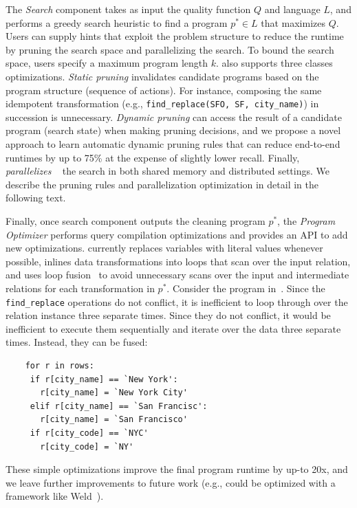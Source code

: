 The {\it Search} component takes as input the quality function $Q$ and language $L$, and performs a greedy search heuristic to find a program $p^* \in L$ that maximizes $Q$.  Users can supply hints that exploit the problem structure to reduce the runtime by pruning the search space and parallelizing the search.  To bound the search space, users specify a maximum program length $k$.    \sys also supports three classes optimizations. {\it Static pruning} invalidates candidate programs based on the program structure (sequence of actions).  For instance, composing the same idempotent transformation (e.g., \texttt{find\_replace(SFO, SF, city\_name)}) in succession is unnecessary.  {\it Dynamic pruning} can access the result of a candidate program (search state) when making pruning decisions, and we propose a novel approach to learn automatic dynamic pruning rules that can reduce end-to-end runtimes by up to 75\% at the expense of slightly lower recall. Finally, \sys ~ {\it parallelizes} ~ the search in both shared memory and distributed settings. We describe the pruning rules and parallelization optimization in detail in the following text.


Finally, once search component outputs the cleaning program $p^*$, the {\it Program Optimizer} performs query compilation optimizations and provides an API to add new optimizations.  \sys currently replaces variables with literal values whenever possible, inlines data transformations into loops that scan over the input relation, and uses loop fusion~\cite{palkar2017weld, crotty2014tupleware} to avoid unnecessary scans over the input and intermediate relations for each transformation in $p^*$.  Consider the program in~.  Since the \texttt{find\_replace} operations do not conflict, it is inefficient to loop through over the relation instance three separate times.  Since they do not conflict, it would be inefficient to execute them sequentially and iterate over the data three separate times.  Instead, they can be fused:


{\small
\begin{lstlisting}
    for r in rows:
     if r[city_name] == `New York':
       r[city_name] = `New York City'
     elif r[city_name] == `San Francisc':
       r[city_name] = `San Francisco'
     if r[city_code] == `NYC'
       r[city_code] = `NY'
\end{lstlisting}
}

These simple optimizations improve the final program runtime by up-to 20x, and we leave further improvements to future work (e.g., could be optimized with a framework like Weld~\cite{palkar2017weld}).


